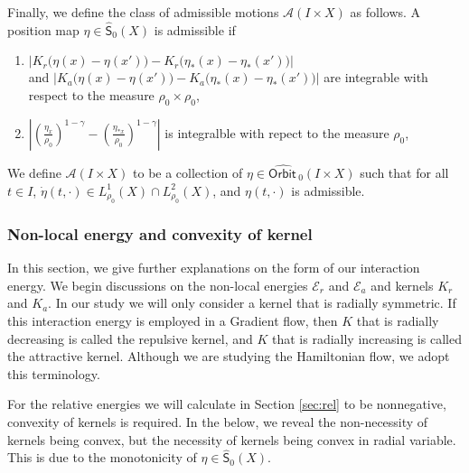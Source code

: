\documentclass[10pt, letterpaper]{article}
\def\Orb{{\textsf{Orbit}}\,}
\def\E{{\mathcal{E}}}
\def\H{{\mathcal{H}}}
\def\K{{\mathcal{K}}}
\theoremstyle{definition}
\theoremstyle{remark}
\begin{document}
Finally, we define the class of admissible motions $\mathcal{A}(I\times X)$ as follows. A position map $\eta \in \hat{\textsf{S}}_0(X)$ is admissible if 
\begin{enumerate}
 \item $\left|K_r\big(\eta(x) -\eta(x')\big)-K_r\big(\eta_*(x) -\eta_*(x')\big)\right|$\\ and $\left|K_a\big(\eta(x) -\eta(x')\big)-K_a\big(\eta_*(x) -\eta_*(x')\big)\right|$ are integrable with respect to the measure $\rho_0\times \rho_0$,
 \item $\left|\left(\frac{\eta_x}{\rho_0}\right)^{1-\gamma}  - \left(\frac{\eta_{*x}}{\rho_0}\right)^{1-\gamma}\right|$ is integralble with repect to the measure $\rho_0$,
\end{enumerate}
We define $\mathcal{A}(I\times X)$ to be a collection of $\eta \in \hat{\Orb}_0(I\times X)$ such that for all $t\in I$, $\dot\eta(t,\cdot) \in L^1_{\rho_0}(X)\cap L^2_{\rho_0}(X)$, and $\eta(t,\cdot)$ is admissible.  %

\subsubsection{Non-local energy and convexity of kernel}
In this section, we give further explanations on the form of our interaction energy. We begin discussions on the non-local energies $\E_r$ and $\E_a$ and kernels $K_r$ and $K_a$. In our study we will only consider a kernel that is radially symmetric. If this interaction energy is employed in a Gradient flow, then ${K}$ that is radially decreasing is called the repulsive kernel, and ${K}$ that is radially increasing is called the attractive kernel. Although we are studying the Hamiltonian flow, we adopt this terminology. 

For the relative energies we will calculate in Section \ref{sec:rel} to be nonnegative, convexity of kernels is required. In the below, we reveal the non-necessity of kernels being convex, but the necessity of kernels being convex in radial variable. This is due to the monotonicity of $\eta\in \hat{\textsf{S}}_0(X)$.
\end{document}
